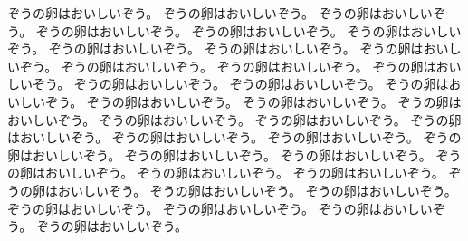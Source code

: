 ぞうの卵はおいしいぞう。
ぞうの卵はおいしいぞう。
ぞうの卵はおいしいぞう。
ぞうの卵はおいしいぞう。
ぞうの卵はおいしいぞう。
ぞうの卵はおいしいぞう。
ぞうの卵はおいしいぞう。
ぞうの卵はおいしいぞう。
ぞうの卵はおいしいぞう。
ぞうの卵はおいしいぞう。
ぞうの卵はおいしいぞう。
ぞうの卵はおいしいぞう。
ぞうの卵はおいしいぞう。
ぞうの卵はおいしいぞう。
ぞうの卵はおいしいぞう。
ぞうの卵はおいしいぞう。
ぞうの卵はおいしいぞう。
ぞうの卵はおいしいぞう。
ぞうの卵はおいしいぞう。
ぞうの卵はおいしいぞう。
ぞうの卵はおいしいぞう。
ぞうの卵はおいしいぞう。
ぞうの卵はおいしいぞう。
ぞうの卵はおいしいぞう。
ぞうの卵はおいしいぞう。
ぞうの卵はおいしいぞう。
ぞうの卵はおいしいぞう。
ぞうの卵はおいしいぞう。
ぞうの卵はおいしいぞう。
ぞうの卵はおいしいぞう。
ぞうの卵はおいしいぞう。
ぞうの卵はおいしいぞう。
ぞうの卵はおいしいぞう。
ぞうの卵はおいしいぞう。
ぞうの卵はおいしいぞう。
ぞうの卵はおいしいぞう。
